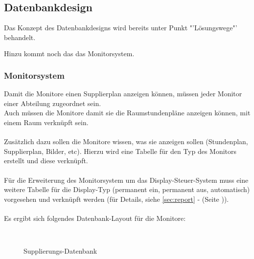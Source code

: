 \subsection{Datenbankdesign}

Das Konzept des Datenbankdesigns wird bereits unter Punkt "'Lösungswege"' behandelt.

Hinzu kommt noch das das Monitorsystem.

\subsubsection{Monitorsystem}

Damit die Monitore einen Supplierplan anzeigen können, müssen jeder Monitor einer Abteilung zugeordnet sein.\\
Auch müssen die Monitore damit sie die Raumstundenpläne anzeigen können, mit einem Raum verknüpft sein.\\
\\
Zusätzlich dazu sollen die Monitore wissen, was sie anzeigen sollen (Stundenplan, Supplierplan, Bilder, etc). Hierzu wird eine Tabelle für den Typ des Monitors erstellt und diese verknüpft.\\
\\ 
Für die Erweiterung des Monitorsystem um das Display-Steuer-System muss eine weitere Tabelle für die Display-Typ (permanent ein, permanent aus, automatisch) vorgesehen und verknüpft werden (für Details, siehe \autoref{sec:report} -   (Seite \pageref{sec:report})).\\
\\
Es ergibt sich folgendes Datenbank-Layout für die Monitore:
\begin{figure}[H]
\centering
{}\\
\caption{Supplierungs-Datenbank}
\end{figure}
